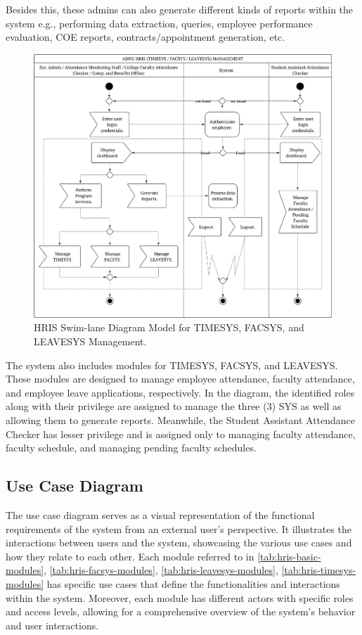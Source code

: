     Besides this, these admins can also generate different kinds of reports within the system e.g., performing data extraction, queries, employee performance evaluation, COE reports, contracts/appointment generation, etc.

    \begin{figure}[H]
        \centering
        \includegraphics[width=1\linewidth]{figures/images/swimlane-sys-mgt.png}
        \caption{HRIS Swim-lane Diagram Model for TIMESYS, FACSYS, and LEAVESYS Management.}
        \label{fig:swimlane-sys-mgt}
    \end{figure}

    The system also includes modules for TIMESYS, FACSYS, and LEAVESYS. These modules are designed to manage employee attendance, faculty attendance, and employee leave applications, respectively. In the diagram, the identified roles along with their privilege are assigned to manage the three (3) SYS as well as allowing them to generate reports. Meanwhile, the Student Assistant Attendance Checker has lesser privilege and is assigned only to managing faculty attendance, faculty schedule, and managing pending faculty schedules.

    \subsection{Use Case Diagram}
    
    The use case diagram serves as a visual representation of the functional requirements of the system from an external user's perspective. It illustrates the interactions between users and the system, showcasing the various use cases and how they relate to each other. Each module referred to in \ref*{tab:hris-basic-modules}, \ref*{tab:hris-facsys-modules}, \ref*{tab:hris-leavesys-modules}, \ref*{tab:hris-timesys-modules} has specific use cases that define the functionalities and interactions within the system. Moreover, each module has different actors with specific roles and access levels, allowing for a comprehensive overview of the system's behavior and user interactions.
    
